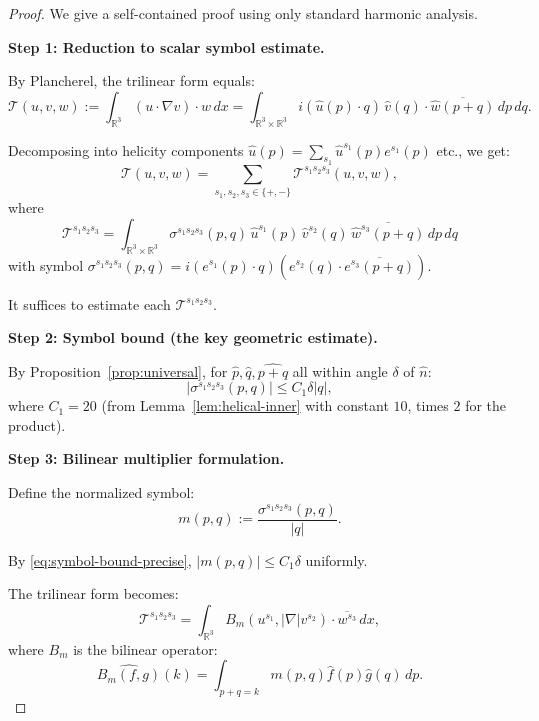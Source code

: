 \documentclass[11pt]{article}
\theoremstyle{definition}
\newcommand{\R}{\mathbb{R}}
\begin{document}
\begin{proof}
We give a self-contained proof using only standard harmonic analysis.

\textbf{Step 1: Reduction to scalar symbol estimate.}

By Plancherel, the trilinear form equals:
\begin{equation}
\mathcal{T}(u,v,w) := \int_{\R^3} (u \cdot \nabla v) \cdot w \, dx = \int_{\R^3 \times \R^3} i(\hat{u}(p) \cdot q) \, \hat{v}(q) \cdot \overline{\hat{w}(p+q)} \, dp \, dq.
\end{equation}

Decomposing into helicity components $\hat{u}(p) = \sum_{s_1} \hat{u}^{s_1}(p) e^{s_1}(p)$ etc., we get:
\begin{equation}
\mathcal{T}(u,v,w) = \sum_{s_1, s_2, s_3 \in \{+,-\}} \mathcal{T}^{s_1 s_2 s_3}(u,v,w),
\end{equation}
where
\begin{equation}
\mathcal{T}^{s_1 s_2 s_3} = \int_{\R^3 \times \R^3} \sigma^{s_1 s_2 s_3}(p,q) \, \hat{u}^{s_1}(p) \, \hat{v}^{s_2}(q) \, \overline{\hat{w}^{s_3}(p+q)} \, dp \, dq
\end{equation}
with symbol $\sigma^{s_1 s_2 s_3}(p,q) = i(e^{s_1}(p) \cdot q)(e^{s_2}(q) \cdot \overline{e^{s_3}(p+q)})$.

It suffices to estimate each $\mathcal{T}^{s_1 s_2 s_3}$.

\textbf{Step 2: Symbol bound (the key geometric estimate).}

By Proposition~\ref{prop:universal}, for $\hat{p}, \hat{q}, \widehat{p+q}$ all within angle $\delta$ of $\hat{n}$:
\begin{equation}\label{eq:symbol-bound-precise}
|\sigma^{s_1 s_2 s_3}(p,q)| \leq C_1 \delta |q|,
\end{equation}
where $C_1 = 20$ (from Lemma~\ref{lem:helical-inner} with constant $10$, times $2$ for the product).

\textbf{Step 3: Bilinear multiplier formulation.}

Define the normalized symbol:
\begin{equation}
m(p,q) := \frac{\sigma^{s_1 s_2 s_3}(p,q)}{|q|}.
\end{equation}

By \eqref{eq:symbol-bound-precise}, $|m(p,q)| \leq C_1 \delta$ uniformly.

The trilinear form becomes:
\begin{equation}
\mathcal{T}^{s_1 s_2 s_3} = \int_{\R^3} B_m(u^{s_1}, |\nabla|v^{s_2}) \cdot \overline{w^{s_3}} \, dx,
\end{equation}
where $B_m$ is the bilinear operator:
\begin{equation}
\widehat{B_m(f,g)}(k) = \int_{p+q=k} m(p,q) \hat{f}(p) \hat{g}(q) \, dp.
\end{equation}


\end{proof}
\end{document}

